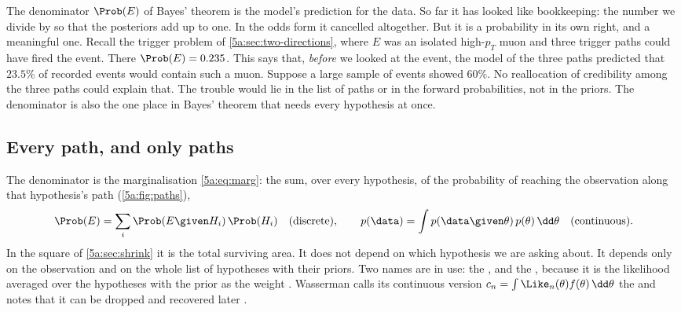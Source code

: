 The denominator $\Prob(E)$ of Bayes' theorem is the model's prediction for the
data. So far it has looked like bookkeeping: the number we divide by so that the
posteriors add up to one. In the odds form it cancelled altogether. But it is a
probability in its own right, and a meaningful one. Recall the trigger problem of
\cref{5a:sec:two-directions}, where $E$ was an isolated high-$p_T$ muon and three
trigger paths could have fired the event. There $\Prob(E)=0.235$. This says that,
\emph{before} we looked at the event, the model of the three paths predicted that
$23.5\%$ of recorded events would contain such a muon. Suppose a large sample of
events showed $60\%$. No reallocation of credibility among the three paths could
explain that. The trouble would lie in the list of paths or in the forward
probabilities, not in the priors. The denominator is also the one place in Bayes'
theorem that needs every hypothesis at once.

\subsection{Every path, and only paths}

The denominator is the marginalisation \eqref{5a:eq:marg}: the sum, over every
hypothesis, of the probability of reaching the observation along that hypothesis's
path (\cref{5a:fig:paths}),
\begin{equation}
  \Prob(E)=\sum_{i}\Prob(E\given H_i)\,\Prob(H_i)
  \quad\text{(discrete)},\qquad
  p(\data)=\int p(\data\given\theta)\,p(\theta)\,\dd\theta
  \quad\text{(continuous)} .
  \label{5a:eq:evidence}
\end{equation}
In the square of \cref{5a:sec:shrink} it is the total surviving area. It does not
depend on which hypothesis we are asking about. It depends only on the observation
and on the whole list of hypotheses with their priors. Two names are in use: the , and the , because it is the likelihood averaged over the hypotheses with the prior
as the weight . Wasserman calls its continuous version $c_n=\int\Like_n(\theta)f(\theta)\,\dd\theta$ the
 and notes that it can be dropped and recovered later
.

